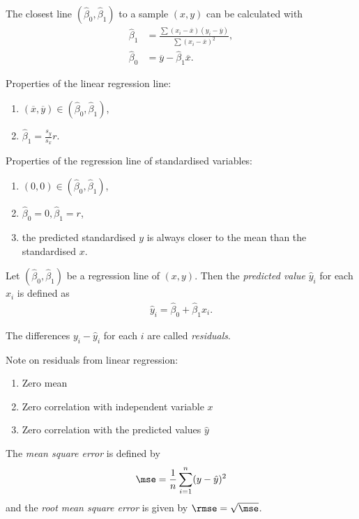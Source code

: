 \documentclass{article}
\renewcommand{\bar}{\overline}
\begin{document}
\begin{theorem}
	The closest line $(\hat\beta_0,\hat\beta_1)$ to a sample $(x,y)$ can be calculated with
	\begin{align*}
		\hat\beta_1&=\frac{\sum(x_i-\bar x)(y_i-\bar y)}{\sum(x_i-\bar x)^2},\\
		\hat\beta_0&=\bar y - \hat\beta_1\bar x.
	\end{align*}
\end{theorem}
Properties of the linear regression line:
\begin{enumerate}
	\item $(\bar x, \bar y)\in(\hat\beta_0, \hat\beta_1)$,
	\item $\hat\beta_1 = \frac{s_y}{s_x}r$.
\end{enumerate}
Properties of the regression line of standardised variables:
\begin{enumerate}
	\item $(0,0)\in(\hat\beta_0,\hat\beta_1)$,
	\item $\hat\beta_0=0,\hat\beta_1=r$,
	\item the predicted standardised $y$ is always closer to the mean than the standardised $x$.
\end{enumerate}
\begin{definition}
	Let $(\hat\beta_0,\hat\beta_1)$ be a regression line of $(x,y)$. Then the
	\emph{predicted value} $\hat y_i$ for each $x_i$ is defined as
	\begin{align*}
		\hat y_i = \hat\beta_0 + \hat\beta_1 x_i.
	\end{align*}
\end{definition}
\begin{definition}
	The differences $y_i - \hat y_i$ for each $i$ are called \emph{residuals}.
\end{definition}
Note on residuals from linear regression:
\begin{enumerate}
	\item Zero mean
	\item Zero correlation with independent variable $x$
	\item Zero correlation with the predicted values $\hat y$
\end{enumerate}
\begin{definition}
	The \emph{mean square error} is defined by
	\begin{align*}
		\mse = \frac{1}{n}\sum_{i=1}^n (y-\hat y)^2
	\end{align*}
	and the \emph{root mean square error} is given by $\rmse=\sqrt{\mse}$.
\end{definition}
\end{document}
